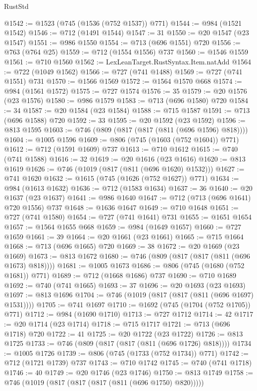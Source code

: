 \begin{lexlean}{RustStd}
\begin{coremodule}
@1542 := @1523 (@745 (@1536 (@752 @1537)) @771)
@1544 := @984 (@1521 @1542)
@1546 := @712 (@1491 @1544)
@1547 := 31
@1550 := @20 @1547 (@23 @1547)
@1551 := @986 @1550
@1554 := @713 (@696 @1551) @720
@1556 := @763 (@764 @25)
@1559 := @712 (@1554 @1556) @737
@1560 := @1546 @1559
@1561 := @710 @1560
@1562 := LexLeanTarget.RustSyntax.Item.natAdd
@1564 := @722 (@1049 @1562)
@1566 := @727 (@741 @1488)
@1569 := @727 (@741 @1551) @731
@1570 := @1566 @1569
@1572 := @1564 @1570 @668
@1574 := @984 (@1561 @1572)
@1575 := @727 @1574
@1576 := 35
@1579 := @20 @1576 (@23 @1576)
@1580 := @986 @1579
@1583 := @713 (@696 @1580) @720
@1584 := 34
@1587 := @20 @1584 (@23 @1584)
@1588 := @715 @1587
@1591 := @713 (@696 @1588) @720
@1592 := 33
@1595 := @20 @1592 (@23 @1592)
@1596 := @813 @1595
@1603 := @746 (@809 (@817 (@817 (@811 (@696 @1596) @818))))
@1604 := @1005 @1596
@1609 := @806 (@745 (@1603 (@752 @1604)) @771)
@1612 := @712 (@1591 @1609) @737
@1613 := @710 @1612
@1615 := @740 (@741 @1588)
@1616 := 32
@1619 := @20 @1616 (@23 @1616)
@1620 := @813 @1619
@1626 := @746 (@1019 (@817 (@811 (@696 @1620) @1532)))
@1627 := @741 @1620
@1632 := @1615 (@745 (@1626 (@752 @1627)) @771)
@1634 := @984 (@1613 @1632)
@1636 := @712 (@1583 @1634)
@1637 := 36
@1640 := @20 @1637 (@23 @1637)
@1641 := @986 @1640
@1647 := @712 (@713 (@696 @1641) @720 @1556) @737
@1648 := @1636 @1647
@1649 := @710 @1648
@1651 := @727 (@741 @1580)
@1654 := @727 (@741 @1641) @731
@1655 := @1651 @1654
@1657 := @1564 @1655 @668
@1659 := @984 (@1649 @1657)
@1660 := @727 @1659
@1661 := 39
@1664 := @20 @1661 (@23 @1661)
@1665 := @715 @1664
@1668 := @713 (@696 @1665) @720
@1669 := 38
@1672 := @20 @1669 (@23 @1669)
@1673 := @813 @1672
@1680 := @746 (@809 (@817 (@817 (@811 (@696 @1673) @818))))
@1681 := @1005 @1673
@1686 := @806 (@745 (@1680 (@752 @1681)) @771)
@1689 := @712 (@1668 @1686) @737
@1690 := @710 @1689
@1692 := @740 (@741 @1665)
@1693 := 37
@1696 := @20 @1693 (@23 @1693)
@1697 := @813 @1696
@1704 := @746 (@1019 (@817 (@817 (@811 (@696 @1697) @1531))))
@1705 := @741 @1697
@1710 := @1692 (@745 (@1704 (@752 @1705)) @771)
@1712 := @984 (@1690 @1710)
@1713 := @727 @1712
@1714 := 42
@1717 := @20 @1714 (@23 @1714)
@1718 := @715 @1717
@1721 := @713 (@696 @1718) @720
@1722 := 41
@1725 := @20 @1722 (@23 @1722)
@1726 := @813 @1725
@1733 := @746 (@809 (@817 (@817 (@811 (@696 @1726) @818))))
@1734 := @1005 @1726
@1739 := @806 (@745 (@1733 (@752 @1734)) @771)
@1742 := @712 (@1721 @1739) @737
@1743 := @710 @1742
@1745 := @740 (@741 @1718)
@1746 := 40
@1749 := @20 @1746 (@23 @1746)
@1750 := @813 @1749
@1758 := @746 (@1019 (@817 (@817 (@817 (@811 (@696 @1750) @820)))))

\end{coremodule}
\end{lexlean}
